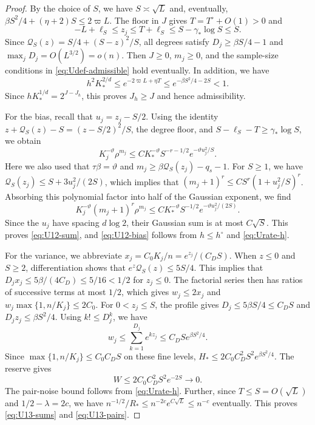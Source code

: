 \begin{proof}
By the choice of $S$, we have $S\asymp\sqrt L$ and, eventually,
$\beta S^2/4+(\eta+2)S\le2\varpi L$.
The floor in $J$ gives $T=T^\circ+O(1)>0$ and
\begin{equation}\label{eq:Urate-range}
 -L+\ell_S\le z_j\le T+\ell_S
 \le S-\gamma_*\log S\le S.
\end{equation}
Since $\mathcal Q_S(z)=S/4+(S-z)^2/S$, all degrees satisfy
$D_j\ge\beta S/4-1$ and $\max_jD_j=O(L^{3/2})=o(n)$.
Then $J\ge0$, $m_j\ge0$, and the sample-size conditions in
\eqref{eq:Udef-admissible} hold eventually. In addition, we have
\begin{equation}\label{eq:U13-reserve}
 h^2K_*^{2/d}\le e^{-2\varpi L+\eta T}
 \le e^{-\beta S^2/4-2S}<1.
\end{equation}
Since $hK_*^{1/d}=2^{J-J_h}$, this proves $J_h\ge J$ and hence
admissibility.

For the bias, recall that $u_j=z_j-S/2$. Using the identity
$z+\mathcal Q_S(z)-S=(z-S/2)^2/S$, the degree floor, and
$S-\ell_S-T\ge\gamma_*\log S$, we obtain
\begin{equation}\label{eq:U12-geom}
 K_j^{-\vartheta}\rho^{m_j}
 \le CK_*^{-\vartheta}S^{-r-1/2}e^{-\vartheta u_j^2/S}.
\end{equation}
Here we also used that $\tau\beta=\vartheta$ and
$m_j\ge\beta\mathcal Q_S(z_j)-q_s-1$.
For $S\ge1$, we have $\mathcal Q_S(z_j)\le S+3u_j^2/(2S)$, which implies
that $(m_j+1)^r\le CS^r(1+u_j^2/S)^r$.
Absorbing this polynomial factor into half of the Gaussian exponent, we
find
\begin{equation}\label{eq:U12-term}
 K_j^{-\vartheta}(m_j+1)^r\rho^{m_j}
 \le CK_*^{-\vartheta}S^{-1/2}e^{-\vartheta u_j^2/(2S)}.
\end{equation}
Since the $u_j$ have spacing $d\log2$, their Gaussian sum is at most
$C\sqrt S$. This proves \eqref{eq:U12-sum}, and
\eqref{eq:U12-bias} follows from $h\le h^\circ$ and
\eqref{eq:Urate-h}.

For the variance, we abbreviate $x_j=C_0K_j/n=e^{z_j}/(C_DS)$.
When $z\le0$ and $S\ge2$, differentiation shows that
$e^z\mathcal Q_S(z)\le5S/4$. This implies that
$D_jx_j\le5\beta/(4C_D)\le5/16<1/2$ for $z_j\le0$.
The factorial series then has ratios of successive terms at most $1/2$,
which gives $w_j\le2x_j$ and
$w_j\max\{1,n/K_j\}\le2C_0$.
For $0<z_j\le S$, the profile gives $D_j\le5\beta S/4\le C_DS$
and $D_jz_j\le\beta S^2/4$. Using $k!\le D_j^k$, we have
\begin{equation}\label{eq:U13-wj}
 w_j\le\sum_{k=1}^{D_j}e^{kz_j}
 \le C_DS e^{\beta S^2/4}.
\end{equation}
Since $\max\{1,n/K_j\}\le C_0C_DS$ on these fine levels,
$H_*\le2C_0C_D^2S^2e^{\beta S^2/4}$. The reserve gives
\begin{equation}\label{eq:U13-fine}
 W\le2C_0C_D^2S^2e^{-2S}\longrightarrow0.
\end{equation}
The pair-noise bound follows from \eqref{eq:Urate-h}.
Further, since $T\le S=O(\sqrt L)$ and $1/2-\lambda=2c$, we have
$n^{-1/2}/R_*\le n^{-2c}e^{C\sqrt L}\le n^{-c}$ eventually.
This proves \eqref{eq:U13-sums} and \eqref{eq:U13-pairs}.


\end{proof}
